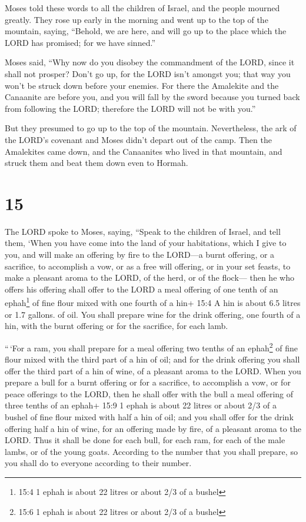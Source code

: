  Moses told these words to all the children of Israel, and
the people mourned greatly.  They rose up early in the
morning and went up to the top of the mountain, saying, ``Behold, we are
here, and will go up to the place which the LORD has promised; for we
have sinned.''

 Moses said, ``Why now do you disobey the commandment of
the LORD, since it shall not prosper?  Don't go up, for the
LORD isn't amongst you; that way you won't be struck down before your
enemies.  For there the Amalekite and the Canaanite are
before you, and you will fall by the sword because you turned back from
following the LORD; therefore the LORD will not be with you.''

 But they presumed to go up to the top of the mountain.
Nevertheless, the ark of the LORD's covenant and Moses didn't depart out
of the camp.  Then the Amalekites came down, and the
Canaanites who lived in that mountain, and struck them and beat them
down even to Hormah.

\hypertarget{section-14}{%
\section{15}\label{section-14}}

 The LORD spoke to Moses, saying,  ``Speak to
the children of Israel, and tell them, `When you have come into the land
of your habitations, which I give to you,  and will make an
offering by fire to the LORD---a burnt offering, or a sacrifice, to
accomplish a vow, or as a free will offering, or in your set feasts, to
make a pleasant aroma to the LORD, of the herd, or of the flock---
 then he who offers his offering shall offer to the LORD a
meal offering of one tenth of an ephah\footnote{15:4 1 ephah is about 22
  litres or about 2/3 of a bushel} of fine flour mixed with one fourth
of a hin+ 15:4 A hin is about 6.5 litres or 1.7 gallons. of oil.
 You shall prepare wine for the drink offering, one fourth
of a hin, with the burnt offering or for the sacrifice, for each lamb.

 ``\,`For a ram, you shall prepare for a meal offering two
tenths of an ephah\footnote{15:6 1 ephah is about 22 litres or about 2/3
  of a bushel} of fine flour mixed with the third part of a hin of oil;
 and for the drink offering you shall offer the third part
of a hin of wine, of a pleasant aroma to the LORD.  When you
prepare a bull for a burnt offering or for a sacrifice, to accomplish a
vow, or for peace offerings to the LORD,  then he shall
offer with the bull a meal offering of three tenths of an ephah+ 15:9 1
ephah is about 22 litres or about 2/3 of a bushel of fine flour mixed
with half a hin of oil;  and you shall offer for the drink
offering half a hin of wine, for an offering made by fire, of a pleasant
aroma to the LORD.  Thus it shall be done for each bull,
for each ram, for each of the male lambs, or of the young goats.
 According to the number that you shall prepare, so you
shall do to everyone according to their number.

